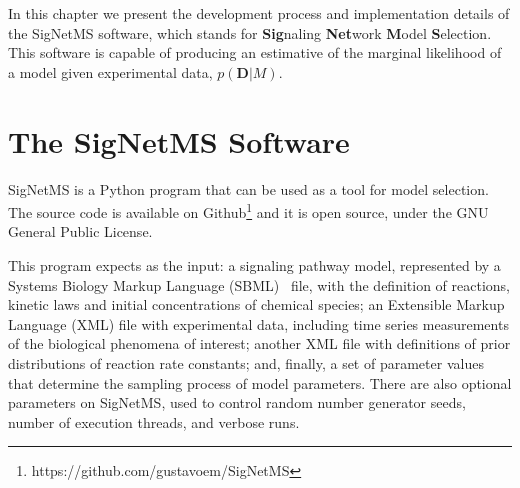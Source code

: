 In this chapter we present the development process and implementation
details of the SigNetMS software, which stands for {\bf Sig}naling 
{\bf Net}work {\bf M}odel {\bf S}election. This software is capable of
producing an estimative of the marginal likelihood of a model given
experimental data, $p({\bm D} | M)$.


\section{The SigNetMS Software}



SigNetMS is a Python program that can be used as a tool for model
selection. The source code is available on 
Github\footnote{https://github.com/gustavoem/SigNetMS} and it is open
source, under the GNU General Public License.

This program expects as the input: a signaling pathway model,
represented by a Systems Biology Markup Language
(SBML)~\cite{hucka2003systems} file, with the definition of reactions,
kinetic laws and initial concentrations of chemical species; an
Extensible Markup Language (XML) file with experimental data, including 
time series measurements of the  biological phenomena of interest;
another XML file with definitions of prior distributions of reaction
rate constants; and, finally, a set of parameter values that determine
the sampling process of model parameters. There are also optional
parameters on SigNetMS, used to control random number generator seeds,
number of execution threads, and verbose runs.

